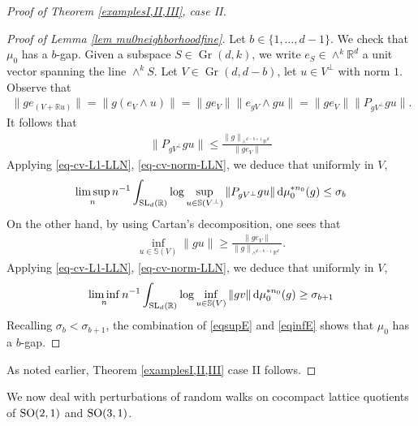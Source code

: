 \documentclass[11pt, leqno, fleqn]{amsart}
\def\SL{   {\rm SL}}
\def\SO{   {\rm SO}}
\def \R{{\mathbb R}}
\newcommand{\dd}{\,\mathrm{d}}
\DeclareMathOperator{\Gr}{Gr}
\theoremstyle{definition}
\theoremstyle{definition}
\def\S{ {\mathbb{S}} }
\begin{document}
\begin{proof}[Proof of Theorem \ref{examplesI,II,III}, case II]
		\begin{proof}[Proof of Lemma \ref{lem mu0neighborhoodfine}] 	
				Let $b\in \{1, \dots, d-1\}$. We check that $\mu_{0}$ has a $b$-gap. 		Given a subspace $S\in \Gr(d,k)$, we write $e_{S}	\in \wedge^{k}\R^d$ a unit vector spanning the line $\wedge^{k}S$.	Let $V\in \Gr(d, d-b)$, let $u\in V^\perp$ with norm $1$.  Observe that
			\begin{align*}
				\|g e_{(V+\R u)}\|= \|g (e_{V}\wedge u)\| =\|g e_{V}\| \|e_{gV}\wedge gu\|= \|g e_{V}\|\| P_{gV^{\perp}} gu  \|.
			\end{align*}
			It follows that					
			\begin{align}\label{eq-proj-rationorm}
				\| P_{gV^{\perp}} gu  \|\leq \frac{\|g\|_{\wedge^{d-b+1}\R^d}}{\|ge_{V}\|} 
			\end{align}
			Applying \eqref{eq-cv-L1-LLN}, \eqref{eq-cv-norm-LLN}, we deduce that uniformly in $V$, 
			\begin{align}\label{eqsupE}
				\limsup_{n} n^{-1}	\int_{\SL_{d}(\R)}  \log \sup_{u \in \S(V^{\perp})} \| P_{gV^{\perp}} gu  \|  \dd\mu_{0}^{* n_0}(g) 	 \leq  \sigma_{b}		
			\end{align}
			On the other hand, by using Cartan's decomposition, one sees that
			\begin{align}\label{eq-inf-rationorm}
				\inf_{u \in \S(V)} \| gu \| \geq \frac{\|g e_{V}\|}{\|g\|_{\wedge^{d-b-1}\R^d }}.		 
			\end{align}
			Applying \eqref{eq-cv-L1-LLN}, \eqref{eq-cv-norm-LLN}, we deduce that uniformly in $V$, 
			\begin{align}\label{eqinfE}
				\liminf_{n} n^{-1} \int_{\SL_{d}(\R)} \log \inf_{u \in \S(V)} \| g v \|   \dd\mu_{0}^{* n_0}(g) 		\geq \sigma_{b+1}		
			\end{align}
			Recalling $\sigma_{b}<\sigma_{b+1}$, the combination of \eqref{eqsupE} and \eqref{eqinfE} shows that $\mu_{0}$ has a $b$-gap.
			
			
		\end{proof}
		
		
	As noted earlier, Theorem \ref{examplesI,II,III} case II follows.	
	
	\end{proof}
	
	
	We now deal with  perturbations of random walks on cocompact lattice quotients of $\SO(2,1)$ and $\SO(3,1)$. 
\end{document}
